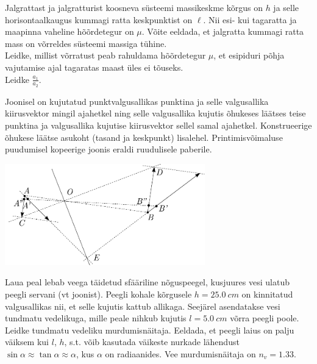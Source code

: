 \documentclass[10pt]{article}
\begin{document}
Jalgrattast ja jalgratturist koosneva süsteemi massikeskme kõrgus on $h$ ja selle horisontaalkaugus kummagi ratta keskpunktist on $\ell$. Nii esi- kui tagaratta ja maapinna vaheline hõõrdetegur on $\mu$. Võite eeldada, et jalgratta kummagi ratta mass on võrreldes süsteemi massiga tühine.\\
\osa Leidke, millist võrratust peab rahuldama hõõrdetegur $\mu$, et esipiduri põhja vajutamise ajal tagaratas maast üles ei tõuseks.\\
\osa Leidke $\frac{a_1}{a_2}$.
\probend
\bigskip


Joonisel on kujutatud punktvalgusallikas punktina ja selle valgusallika kiirusvektor mingil ajahetkel ning selle valgusallika kujutis õhukeses läätses teise punktina ja valgusallika kujutise kiirusvektor sellel samal ajahetkel. Konstrueerige õhukese läätse asukoht (tasand ja keskpunkt) lisalehel. Printimisvõimaluse puudumisel kopeerige joonis eraldi ruudulisele paberile.
\begin{center}
	\includegraphics[width=0.65\textwidth]{2021-v2g-09-yl.pdf}
\end{center}
\probend
\bigskip


Laua peal lebab veega täidetud sfääriline nõguspeegel, kusjuures vesi ulatub peegli servani (vt joonist). Peegli kohale kõrgusele $h=\SI{25.0}{cm}$ on kinnitatud valgusallikas nii, et selle kujutis kattub allikaga. Seejärel asendatakse vesi tundmatu vedelikuga, mille peale nihkub kujutis $l=\SI{5.0}{cm}$ võrra peegli poole. Leidke tundmatu vedeliku murdumisnäitaja. Eeldada, et peegli laius on palju väiksem kui $l$, $h$, s.t. võib kasutada väikeste nurkade lähendust $\sin \alpha \approx \tan \alpha \approx \alpha$, kus $\alpha$ on radiaanides. Vee murdumisnäitaja on $n_v=\num{1.33}$.
\begin{figure}[h]
  \centering
\end{figure}
\vspace{-1.5em}
\probend
\bigskip
\end{document}

